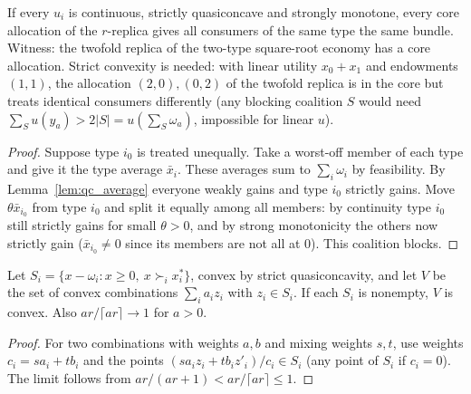 \begin{theorem}
\label{thm:equal_treatment}
\leanok
{}
If every $u_i$ is continuous, strictly quasiconcave and strongly monotone, every core allocation of the $r$-replica
gives all consumers of the same type the same bundle. Witness: the twofold replica of the two-type square-root economy
has a core allocation. Strict convexity is needed: with linear utility $x_0 + x_1$ and endowments $(1,1)$, the
allocation $(2,0), (0,2)$ of the twofold replica is in the core but treats identical consumers differently (any blocking
coalition $S$ would need $\sum_S u(y_a) > 2|S| = u(\sum_S \omega_a)$, impossible for linear $u$).
\end{theorem}
\begin{proof}
\leanok
Suppose type $i_0$ is treated unequally. Take a worst-off member of each type and give it the type average $\bar x_i$.
These averages sum to $\sum_i \omega_i$ by feasibility. By Lemma~\ref{lem:qc_average} everyone weakly gains and type
$i_0$ strictly gains. Move $\theta \bar x_{i_0}$ from type $i_0$ and split it equally among all members: by continuity
type $i_0$ still strictly gains for small $\theta > 0$, and by strong monotonicity the others now strictly gain
($\bar x_{i_0} \ne 0$ since its members are not all at $0$). This coalition blocks.
\end{proof}

\begin{lemma}
\label{lem:improving_trades}
\leanok
Let $S_i = \{x - \omega_i : x \ge 0,\ x \succ_i x^*_i\}$, convex by strict quasiconcavity, and let $V$ be the set of
convex combinations $\sum_i a_i z_i$ with $z_i \in S_i$. If each $S_i$ is nonempty, $V$ is convex. Also
$a r / \lceil a r \rceil \to 1$ for $a > 0$.
\end{lemma}
\begin{proof}
\leanok
For two combinations with weights $a, b$ and mixing weights $s, t$, use weights $c_i = s a_i + t b_i$ and the points
$(s a_i z_i + t b_i z'_i)/c_i \in S_i$ (any point of $S_i$ if $c_i = 0$). The limit follows from
$ar/(ar+1) < ar/\lceil ar \rceil \le 1$.
\end{proof}

